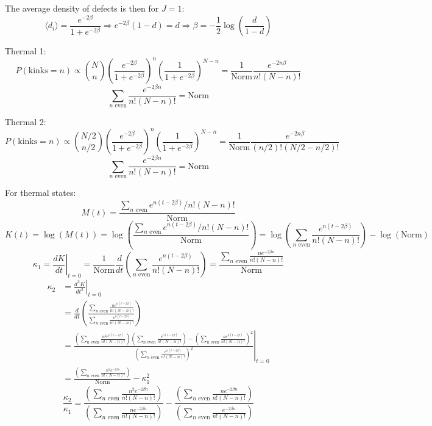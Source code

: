 \documentclass{article}
\begin{document}
The average density of defects is then for $J=1$:
\[
    \langle d_i \rangle = \frac{e^{-2\beta}}{1 + e^{-2\beta}} \Rightarrow e^{-2\beta}(1-d) = d \Rightarrow \beta = -\frac{1}{2} \log\left(\frac{d}{1-d}\right)
\]

Thermal 1:
\[
    P(\text{kinks}=n) \propto \binom{N}{n} \left(\frac{e^{-2\beta}}{1 + e^{-2\beta}}\right)^n \left(\frac{1}{1 + e^{-2\beta}}\right)^{N-n} = \frac{1}{\text{Norm}} \frac{e^{-2n\beta}}{n!(N-n)!}
\]
\[
    \sum_{n \text{ even}} \frac{e^{-2\beta n}}{n!(N-n)!} = \text{Norm}
\]

Thermal 2:
\[
    P(\text{kinks}=n) \propto \binom{N/2}{n/2} \left(\frac{e^{-2\beta}}{1 + e^{-2\beta}}\right)^n \left(\frac{1}{1 + e^{-2\beta}}\right)^{N-n} = \frac{1}{\text{Norm}} \frac{e^{-2n\beta}}{(n/2)!(N/2-n/2)!}
\]
\[
    \sum_{n \text{ even}} \frac{e^{-2\beta n}}{n!(N-n)!} = \text{Norm}
\]

For thermal states:
\[
    M(t) = \frac{\sum_{n \text{ even}} e^{n(t-2\beta)} / n!(N-n)!}{\text{Norm}}
\]
\[
    K(t) = \log(M(t)) = \log\left(\frac{\sum_{n \text{ even}} e^{n(t-2\beta)} / n!(N-n)!}{\text{Norm}}\right) = \log\left(\sum_{n \text{ even}} \frac{e^{n(t-2\beta)}}{n!(N-n)!}\right) - \log(\text{Norm})
\]
\[
    \kappa_1 = \left. \frac{dK}{dt} \right|_{t=0} = \frac{1}{\text{Norm}} \frac{d}{dt} \left(\sum_{n \text{ even}} \frac{e^{n(t-2\beta)}}{n!(N-n)!}\right) = \frac{\sum_{n \text{ even}} \frac{ne^{-2\beta n}}{n!(N-n)!}}{\text{Norm}}
\]
\begin{align*}
    \kappa_2 & = \left. \frac{d^2 K}{dt^2} \right|_{t=0}                                                                                                                                                                                                                                                                               \\
             & = \frac{d}{dt} \left(\frac{\sum_{n \text{ even}} \frac{ne^{n(t-2\beta)}}{n!(N-n)!}}{\sum_{n \text{ even}} \frac{e^{n(t-2\beta)}}{n!(N-n)!}}\right)                                                                                                                                                                      \\
             & = \left.\frac{\left(\sum_{n \text{ even}} \frac{n^2 e^{n(t-2\beta)}}{n!(N-n)!}\right) \left(\sum_{n \text{ even}} \frac{e^{n(t-2\beta)}}{n!(N-n)!}\right) - \left(\sum_{n \text{ even}} \frac{ne^{n(t-2\beta)}}{n!(N-n)!}\right)^2}{\left(\sum_{n \text{ even}} \frac{e^{n(t-2\beta)}}{n!(N-n)!}\right)^2}\right|_{t=0} \\
             & = \frac{\left(\sum_{n \text{ even}} \frac{n^2 e^{-2\beta n}}{n!(N-n)!}\right)}{\text{Norm}} - \kappa_1^2
\end{align*}
\[
    \frac{\kappa_2}{\kappa_1} = \frac{\left(\sum_{n \text{ even}} \frac{n^2 e^{-2\beta n}}{n!(N-n)!}\right)}{\left(\sum_{n \text{ even}} \frac{ne^{-2\beta n}}{n!(N-n)!}\right)} - \frac{\left(\sum_{n \text{ even}} \frac{ne^{-2\beta n}}{n!(N-n)!}\right)}{\left(\sum_{n \text{ even}} \frac{e^{-2\beta n}}{n!(N-n)!}\right)}
\]
\end{document}
